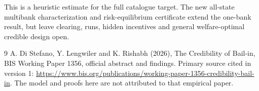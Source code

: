 \documentclass[11pt]{article}
\theoremstyle{definition}
\begin{document}
This is a heuristic estimate for the full catalogue target. The new all-state
multibank characterization and risk-equilibrium certificate extend the
one-bank result, but leave clearing, runs, hidden incentives and general
welfare-optimal credible design open.

\begin{thebibliography}{9}
 A. Di Stefano, Y. Lengwiler and K. Rishabh (2026), The Credibility of Bail-in, BIS Working Paper 1356, official abstract and findings. Primary source cited in version 1: \url{https://www.bis.org/publications/working-paper-1356-credibility-bail-in}. The model and proofs here are not attributed to that empirical paper.
\end{thebibliography}
\end{document}
